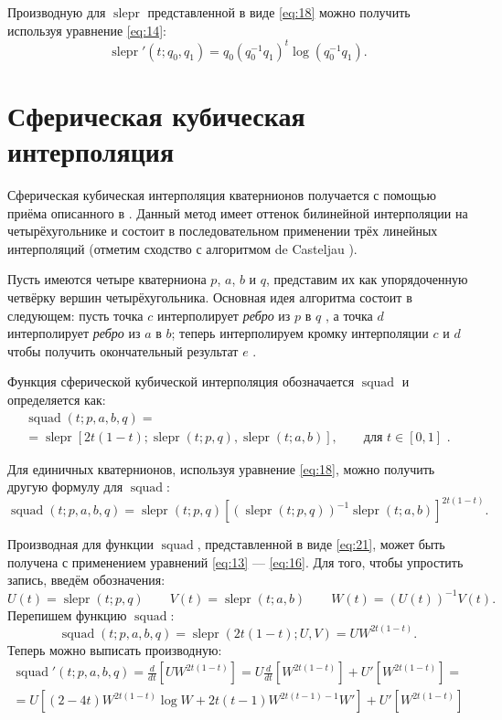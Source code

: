 \documentclass[draft]{article}
\DeclareMathOperator{\slerp}{slepr}
\DeclareMathOperator{\squad}{squad}
\begin{document}
Производную для $\slerp$ представленной в виде \ref{eq:18} можно получить используя уравнение \ref{eq:14}:
\begin{equation}
\label{eq:19}
\slerp'(t; q_0, q_1) = q_0 (q_0^{-1} q_1)^t \log(q_0^{-1}q_1) .
\end{equation}

\section{Сферическая кубическая интерполяция}

Сферическая кубическая интерполяция кватернионов получается с помощью приёма описанного в \cite{Boehm}. Данный метод имеет оттенок билинейной интерполяции на четырёхугольнике и состоит в последовательном применении  трёх линейных интерполяций (отметим сходство с алгоритмом de Casteljau \cite{GerlandFarin}).

Пусть имеются четыре кватерниона $p$, $a$, $b$ и $q$, представим их как упорядоченную четвёрку вершин четырёхугольника. Основная идея алгоритма состоит в следующем: пусть точка $c$ интерполирует {\it ребро} из $p$ в $q$%
, а точка $d$ интерполирует {\it ребро} из $a$ в $b$; теперь интерполируем кромку интерполяции $c$ и $d$ чтобы получить окончательный результат $e$ .

Функция сферической кубической интерполяция обозначается $\squad$ и определяется как:
\begin{multline}
\label{eq:20}
\squad(t; p, a, b, q) = {} \\
{} = \slerp[2 t (1 - t); \slerp(t; p, q), \slerp(t; a, b)] , \qquad \text{для $t \in [0, 1]$ .}
\end{multline}

Для единичных кватернионов, используя уравнение \ref{eq:18}, можно получить 
другую формулу для $\squad$:
\begin{equation}
\label{eq:21}
\squad(t; p, a, b, q) = \slerp(t; p, q) [(\slerp(t; p, q))^{-1} \slerp(t; a, b)]^{2 t (1 - t)} .
\end{equation}

Производная для функции $\squad$, представленной в виде \ref{eq:21}, может быть получена с применением уравнений \ref{eq:13} — \ref{eq:16}. Для того, чтобы упростить запись, введём обозначения:
\[ U(t) = \slerp(t; p, q) \qquad V(t) = \slerp(t; a, b) \qquad W(t) = (U(t))^{-1} V(t) .\]
Перепишем функцию $\squad$:
\[ \squad(t; p, a, b, q) = \slerp(2 t (1 - t); U, V) = U W^{2 t (1 - t)} . \]
Теперь можно выписать производную:
\begin{multline}
\label{eq:22}
\squad'(t; p, a, b, q) = \frac{d}{dt}[UW^{2 t (1 - t)}] = U \frac{d}{dt}[W^{2 t (1 - t)}] + U' [W^{2 t (1 - t)}] = {} \\
{} = U[(2 - 4 t) W^{2 t (1 - t)} \log{}W + 2 t (t - 1) W^{2 t (t - 1) - 1} W'] + U' [W^{2 t (1 - t)}] 
\end{multline}
\end{document}
